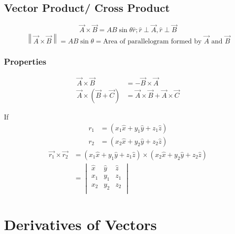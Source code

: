 \documentclass[fleqn]{article}
\begin{document}
\subsection{Vector Product/ Cross Product}

\begin{equation*}
	\overrightarrow{A} \times \overrightarrow{B} = A B \sin \theta \hat{r} ; \hat{r} \perp \overrightarrow{A}, \hat{r} \perp \overrightarrow{B}
\end{equation*}
\begin{equation*}
	\left\| \overrightarrow{A} \times \overrightarrow{B} \right\| = A B \sin \theta = \text{Area of parallelogram formed by $\overrightarrow{A}$ and $\overrightarrow{B}$} 
\end{equation*}

\subsubsection{Properties}

\begin{align*}
\overrightarrow{A} \times \overrightarrow{B} &= - \overrightarrow{B} \times \overrightarrow{A}\\
\overrightarrow{A} \times (\overrightarrow{B} + \overrightarrow{C}) &= \overrightarrow{A} \times \overrightarrow{B} + \overrightarrow{A} \times \overrightarrow{C}
\end{align*}

If 
\begin{align*}
	r_1 &= (x_1 \hat{x} + y_1 \hat{y} + z_1 \hat{z})\\
	r_2 &= (x_2 \hat{x} + y_2 \hat{y} + z_2 \hat{z})
\end{align*}
\begin{align*}
	\overrightarrow{r_1} \times \overrightarrow{r_2} &= (x_1 \hat{x} + y_1 \hat{y} + z_1 \hat{z}) \times (x_2 \hat{x} + y_2 \hat{y} + z_2 \hat{z})\\
	&= 
	\begin{vmatrix}
		\hat{x} & \hat{y} & \hat{z}\\
		x_1 & y_1 & z_1\\
		x_2 & y_2 & z_2\\
	\end{vmatrix}
\end{align*}

\section{Derivatives of Vectors}
\end{document}

